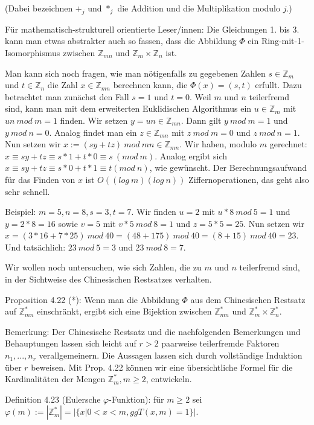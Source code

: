 \documentclass[a4paper]{article}
\begin{document}
\begin{multicols}{3}
    (Dabei bezeichnen $+_j$ und $*_j$ die Addition und die Multiplikation modulo $j$.)

    Für mathematisch-strukturell orientierte Leser/innen: Die Gleichungen 1. bis 3. kann man etwas abstrakter auch so fassen, dass die Abbildung $\Phi$ ein Ring-mit-1-Isomorphismus zwischen $\mathbb{Z}_{mn}$ und $\mathbb{Z}_m \times\mathbb{Z}_n$ ist.

    Man kann sich noch fragen, wie man nötigenfalls zu gegebenen Zahlen $s\in\mathbb{Z}_m$ und $t\in\mathbb{Z}_n$ die Zahl $x\in\mathbb{Z}_{mn}$ berechnen kann, die $\Phi(x)=(s,t)$ erfullt. Dazu betrachtet man zunächst den Fall $s=1$ und $t=0$. Weil $m$ und $n$ teilerfremd sind, kann man mit dem erweiterten Euklidischen Algorithmus ein $u\in\mathbb{Z}_{m}$ mit $un\ mod\ m=1$
    finden. Wir setzen $y=un\in\mathbb{Z}_{mn}$. Dann gilt $y\ mod\ m=1$ und $y\ mod\ n=0$. Analog findet man ein $z\in\mathbb{Z}_{mn}$ mit $z\ mod\ m=0$ und $z\ mod\ n=1$. Nun setzen wir $x:=(sy+tz)\ mod\ mn\in\mathbb{Z}_{mn}$. Wir haben, modulo $m$ gerechnet: $x\equiv sy+tz\equiv s*1+t* 0 \equiv s\ (mod\ m)$. Analog ergibt sich $x\equiv sy+tz\equiv s*0+t*1 \equiv t(mod\ n)$, wie gewünscht. Der Berechnungsaufwand für das Finden von $x$ ist $O((log\ m)(log\ n))$ Ziffernoperationen, das geht also sehr schnell.

    Beispiel: $m=5,n=8,s=3,t=7$. Wir finden $u=2$ mit $u*8\ mod\ 5 = 1$ und $y= 2*8=16$ sowie $v=5$ mit $v*5\ mod\ 8=1$ und $z=5*5=25$. Nun setzen wir $x=(3*16+7*25) \ mod\ 40=(48+175)\ mod\ 40 = (8 + 15)\ mod\ 40 = 23$. Und tatsächlich: $23\ mod\ 5 = 3$ und $23\ mod\ 8 = 7$.

    Wir wollen noch untersuchen, wie sich Zahlen, die zu $m$ und $n$ teilerfremd sind, in der Sichtweise des Chinesischen Restsatzes verhalten.

    Proposition 4.22 (*): Wenn man die Abbildung $\Phi$ aus dem Chinesischen Restsatz auf $\mathbb{Z}^*_{mn}$ einschränkt, ergibt sich eine Bijektion zwischen $\mathbb{Z}^*_{mn}$ und $\mathbb{Z}^*_m\times\mathbb{Z}^*_n$.

    Bemerkung: Der Chinesische Restsatz und die nachfolgenden Bemerkungen und Behauptungen lassen sich leicht auf $r>2$ paarweise teilerfremde Faktoren $n_1,...,n_r$
    verallgemeinern. Die Aussagen lassen sich durch vollständige Induktion über $r$ beweisen. Mit Prop. 4.22 können wir eine übersichtliche Formel für die Kardinalitäten der Mengen $\mathbb{Z}^*_m, m\geq 2$, entwickeln.

    Definition 4.23 (Eulersche $\varphi$-Funktion): für $m\geq 2$ sei $\varphi(m):=|\mathbb{Z}^*_m| =|\{x| 0<x<m,ggT(x,m) = 1\}|$.


\end{multicols}
\end{document}
